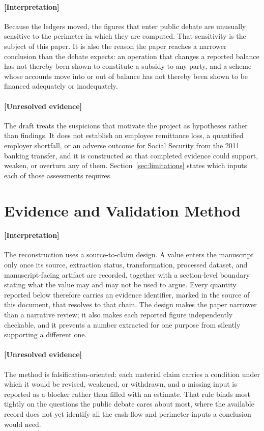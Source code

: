 \documentclass[11pt]{article}
\begin{document}
\paragraph{[Interpretation]}
Because the ledgers moved, the figures that enter public debate are unusually sensitive to the perimeter in which they are computed. That sensitivity is the subject of this paper. It is also the reason the paper reaches a narrower conclusion than the debate expects: an operation that changes a reported balance has not thereby been shown to constitute a subsidy to any party, and a scheme whose accounts move into or out of balance has not thereby been shown to be financed adequately or inadequately.

\paragraph{[Unresolved evidence]}
The draft treats the suspicions that motivate the project as hypotheses rather than findings. It does not establish an employee remittance loss, a quantified employer shortfall, or an adverse outcome for Social Security from the 2011 banking transfer, and it is constructed so that completed evidence could support, weaken, or overturn any of them. Section~\ref{sec:limitations} states which inputs each of those assessments requires.

\section{Evidence and Validation Method}
\label{sec:method}
\paragraph{[Interpretation]}
The reconstruction uses a source-to-claim design. A value enters the manuscript only once its source, extraction status, transformation, processed dataset, and manuscript-facing artifact are recorded, together with a section-level boundary stating what the value may and may not be used to argue. Every quantity reported below therefore carries an evidence identifier, marked in the source of this document, that resolves to that chain. The design makes the paper narrower than a narrative review; it also makes each reported figure independently checkable, and it prevents a number extracted for one purpose from silently supporting a different one.

\paragraph{[Unresolved evidence]}
The method is falsification-oriented: each material claim carries a condition under which it would be revised, weakened, or withdrawn, and a missing input is reported as a blocker rather than filled with an estimate. That rule binds most tightly on the questions the public debate cares about most, where the available record does not yet identify all the cash-flow and perimeter inputs a conclusion would need.
\end{document}
